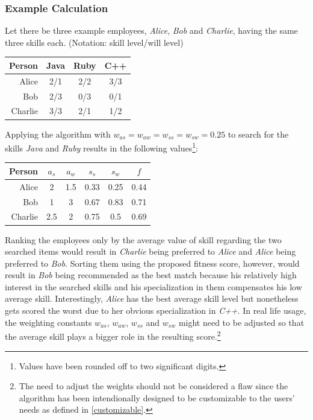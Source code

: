 \newpage
\subsubsection{Example Calculation}
Let there be three example employees, \textit{Alice}, \textit{Bob} and \textit{Charlie}, having the same three skills each.
(Notation: skill level/will level)
\label{example-fitness}
\newline
\newline
\begin{center}
\begin{tabular}{r|ccc}
  Person  & Java & Ruby & C++ \\
  \hline
  Alice   & 2/1  & 2/2 & 3/3 \\
  Bob     & 2/3  & 0/3 & 0/1 \\
  Charlie & 3/3  & 2/1 & 1/2 \\
\end{tabular}
\end{center}

Applying the algorithm with $w_{as} = w_{aw} = w_{ss} = w_{sw} = 0.25$ to search for the skills \textit{Java} and \textit{Ruby} results in the following values\footnote{Values have been rounded off to two significant digits.}:


\begin{center}
\begin{tabular}{r|cccc|c}
  Person  & $a_s$ & $a_w$ & $s_s$ & $s_w$ & $f$\\
  \hline
  Alice   & 2   & 1.5 & 0.33 & 0.25 & 0.44\\
  Bob     & 1   & 3   & 0.67 & 0.83 & 0.71\\
  Charlie & 2.5 & 2   & 0.75 & 0.5  & 0.69\\
\end{tabular}
\end{center}

Ranking the employees only by the average value of skill regarding the two searched items would result in \textit{Charlie} being preferred to \textit{Alice} and \textit{Alice} being preferred to \textit{Bob}. Sorting them using the proposed fitness score, however, would result in \textit{Bob} being recommended as the best match because his relatively high interest in the searched skills and his specialization in them compensates his low average skill. Interestingly, \textit{Alice} has the best average skill level but nonetheless gets scored the worst due to her obvious specialization in \textit{C++}. In real life usage, the weighting constants $w_{as}$, $w_{aw}$, $w_{ss}$ and $ w_{sw}$ might need to be adjusted so that the average skill plays a bigger role in the resulting score.\footnote{The need to adjust the weights should not be considered a flaw since the algorithm has been intendionally designed to be customizable to the users' needs as defined in \ref{customizable}.}


